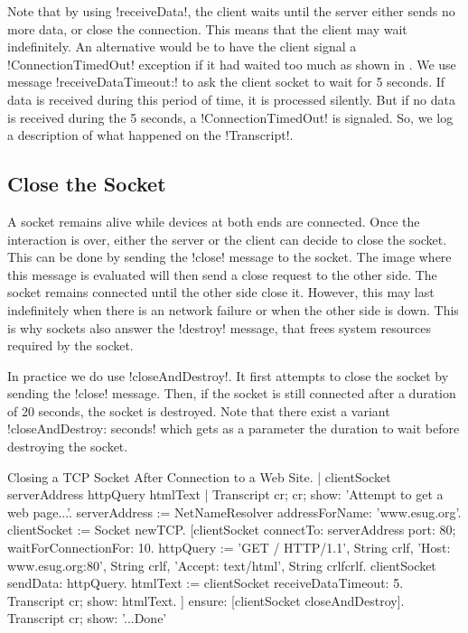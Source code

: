 \documentclass[a4paper,10pt,twoside]{book}
\begin{document}
Note that by using  \ct!receiveData!, the client waits until the server either sends no more data, or close the connection.
This means that the client may wait indefinitely.
An alternative would be to have the client signal a \ct!ConnectionTimedOut! exception if it had waited too much as shown in .
We use message \ct!receiveDataTimeout:! to ask the client socket to wait for 5 seconds.
If data is received during this period of time, it is processed silently.
But if no data is received during the 5 seconds, a \ct!ConnectionTimedOut! is signaled.
So, we log a description of what happened on the \ct!Transcript!.

\subsection{Close the Socket}
A socket remains alive while devices at both ends are connected.
Once the interaction is over, either the server or the client can decide to close the socket.
This can be done by sending the \ct!close! message to the socket.
The image where this message is evaluated will then send a close request to the other side.
The socket remains connected until the other side close it.
However, this may last indefinitely when there is an network failure or when the other side is down.
This is why sockets also answer the \ct!destroy! message, that frees system resources required by the socket.

In practice we do use \ct!closeAndDestroy!.
It first attempts to close the socket by sending the \ct!close! message.
Then, if the socket is still connected after a duration of 20 seconds, the socket is destroyed.
Note that there exist a variant \ct!closeAndDestroy: seconds! which gets as a parameter the duration to wait before destroying the socket.

\begin{script}[closeAndDestroy]{Closing a TCP Socket After Connection to a Web Site.}
| clientSocket serverAddress httpQuery htmlText |
Transcript cr; cr; show: 'Attempt to get a web page...'.
serverAddress := NetNameResolver addressForName: 'www.esug.org'.
clientSocket := Socket newTCP.
[clientSocket 
	connectTo: serverAddress port: 80;
	waitForConnectionFor: 10.
 httpQuery := 'GET / HTTP/1.1', String crlf, 
	'Host: www.esug.org:80', String crlf, 
	'Accept: text/html', String crlfcrlf.
 clientSocket sendData: httpQuery.
 htmlText  := clientSocket receiveDataTimeout: 5.
 Transcript cr; show: htmlText.
] ensure: [clientSocket closeAndDestroy].
Transcript cr; show: '...Done'
\end{script}
\end{document}
